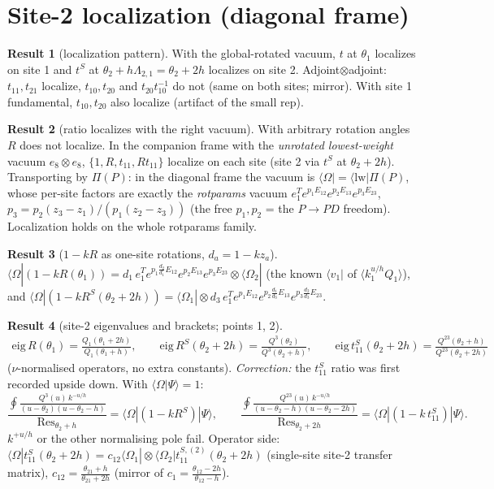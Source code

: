 \documentclass[11pt]{article}
\newcommand{\Om}{\langle\Omega|}
\theoremstyle{definition}
\newtheorem{result}{Result}
\theoremstyle{remark}
\begin{document}
\section{Site-2 localization (diagonal frame)}

\begin{result}[localization pattern]
With the global-rotated vacuum, $t$ at $\theta_1$ localizes on site 1 and $t^S$ at $\theta_2+h\Lambda_{2,1}=\theta_2+2h$ localizes on site 2. Adjoint$\otimes$adjoint: $t_{11},t_{21}$ localize, $t_{10},t_{20}$ and $t_{20}t_{10}^{-1}$ do not (same on both sites; mirror). With site 1 fundamental, $t_{10},t_{20}$ also localize (artifact of the small rep).
\end{result}

\begin{result}[ratio localizes with the right vacuum]
With arbitrary rotation angles $R$ does not localize. In the companion frame with the \emph{unrotated lowest-weight} vacuum $e_8\otimes e_8$, $\{1,R,t_{11},Rt_{11}\}$ localize on each site (site 2 via $t^S$ at $\theta_2+2h$). Transporting by $\Pi(P)$: in the diagonal frame the vacuum is $\langle\Omega|=\langle\mathrm{lw}|\Pi(P)$, whose per-site factors are exactly the \emph{rotparams} vacuum $e_1^Te^{p_1E_{12}}e^{p_2E_{13}}e^{p_3E_{23}}$, $p_3=p_2(z_3-z_1)/(p_1(z_2-z_3))$ (the free $p_1,p_2$ = the $P\to PD$ freedom). Localization holds on the whole rotparams family.
\end{result}

\begin{result}[$1-kR$ as one-site rotations, $d_a=1-kz_a$]
$\Om(1-kR(\theta_1))=d_1\,e_1^Te^{p_1\frac{d_2}{d_1}E_{12}}e^{p_2E_{13}}e^{p_3E_{23}}\otimes\langle\Omega_2|$ (the known $\langle v_1|$ of $\langle k_1^{u/h}Q_1\rangle$), and
$\Om(1-kR^S(\theta_2+2h))=\langle\Omega_1|\otimes d_3\,e_1^Te^{p_1E_{12}}e^{p_2\frac{d_1}{d_3}E_{13}}e^{p_3\frac{d_2}{d_3}E_{23}}$.
\end{result}

\begin{result}[site-2 eigenvalues and brackets; points 1, 2]
\begin{gather*}
\mathrm{eig}\,R(\theta_1)=\frac{Q_1(\theta_1+2h)}{Q_1(\theta_1+h)},\qquad
\mathrm{eig}\,R^S(\theta_2+2h)=\frac{Q^3(\theta_2)}{Q^3(\theta_2+h)},\qquad
\mathrm{eig}\,t^S_{11}(\theta_2+2h)=\frac{Q^{23}(\theta_2+h)}{Q^{23}(\theta_2+2h)}
\end{gather*}
($\nu$-normalised operators, no extra constants). \emph{Correction:} the $t^S_{11}$ ratio was first recorded upside down.
With $\langle\Omega|\Psi\rangle=1$:
\[
\frac{\oint\frac{Q^3(u)\,k^{-u/h}}{(u-\theta_2)(u-\theta_2-h)}}{\mathrm{Res}_{\theta_2+h}}=\Om(1-kR^S)|\Psi\rangle,\qquad
\frac{\oint\frac{Q^{23}(u)\,k^{-u/h}}{(u-\theta_2-h)(u-\theta_2-2h)}}{\mathrm{Res}_{\theta_2+2h}}=\Om(1-k\,t^S_{11})|\Psi\rangle .
\]
$k^{+u/h}$ or the other normalising pole fail. Operator side: $\Om t^S_{11}(\theta_2+2h)=c_{12}\langle\Omega_1|\otimes\langle\Omega_2|t^{S,(2)}_{11}(\theta_2+2h)$ (single-site site-2 transfer matrix), $c_{12}=\frac{\theta_{21}+h}{\theta_{21}+2h}$ (mirror of $c_1=\frac{\theta_{12}-2h}{\theta_{12}-h}$).
\end{result}
\end{document}
